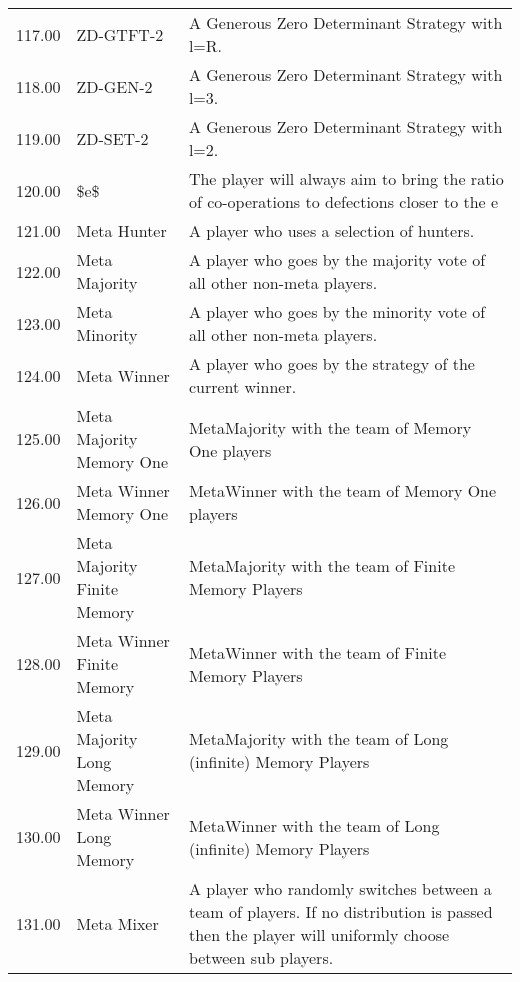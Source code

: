 \begin{tabular}{rll}
	117.00 & ZD-GTFT-2                   & A Generous Zero Determinant Strategy with l=R.                                                                                    \\
	118.00 & ZD-GEN-2                    & A Generous Zero Determinant Strategy with l=3.                                                                                    \\
	119.00 & ZD-SET-2                    & A Generous Zero Determinant Strategy with l=2.                                                                                    \\
	120.00 & \$e\$                       & The player will always aim to bring the ratio of co-operations to defections closer to the e                                      \\
	121.00 & Meta Hunter                 & A player who uses a selection of hunters.                                                                                         \\
	122.00 & Meta Majority               & A player who goes by the majority vote of all other non-meta players.                                                             \\
	123.00 & Meta Minority               & A player who goes by the minority vote of all other non-meta players.                                                             \\
	124.00 & Meta Winner                 & A player who goes by the strategy of the current winner.                                                                          \\
	125.00 & Meta Majority Memory One    & MetaMajority with the team of Memory One players                                                                                  \\
	126.00 & Meta Winner Memory One      & MetaWinner with the team of Memory One players                                                                                    \\
	127.00 & Meta Majority Finite Memory & MetaMajority with the team of Finite Memory Players                                                                               \\
	128.00 & Meta Winner Finite Memory   & MetaWinner with the team of Finite Memory Players                                                                                 \\
	129.00 & Meta Majority Long Memory   & MetaMajority with the team of Long (infinite) Memory Players                                                                      \\
	130.00 & Meta Winner Long Memory     & MetaWinner with the team of Long (infinite) Memory Players                                                                        \\
	131.00 & Meta Mixer                  & A player who randomly switches between a team of players.
	If no distribution is passed then the player will uniformly choose between
	sub players.


\end{tabular}
